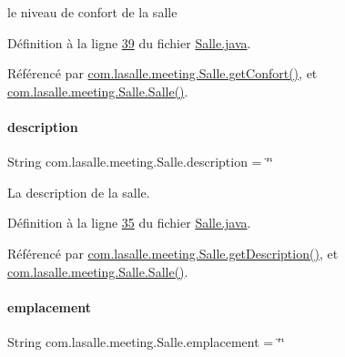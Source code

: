 le niveau de confort de la salle 



Définition à la ligne \hyperlink{_salle_8java_source_l00039}{39} du fichier \hyperlink{_salle_8java_source}{Salle.\+java}.



Référencé par \hyperlink{_salle_8java_source_l00224}{com.\+lasalle.\+meeting.\+Salle.\+get\+Confort()}, et \hyperlink{_salle_8java_source_l00054}{com.\+lasalle.\+meeting.\+Salle.\+Salle()}.

\mbox{\label{classcom_1_1lasalle_1_1meeting_1_1_salle_a79547b79b4e812619f6cc764dbe7a80b}} 
\paragraph{\texorpdfstring{description}{description}}
{\footnotesize\ttfamily String com.\+lasalle.\+meeting.\+Salle.\+description = \char`\"{}\char`\"{}\hspace{0.3cm}{\ttfamily [private]}}



La description de la salle. 



Définition à la ligne \hyperlink{_salle_8java_source_l00035}{35} du fichier \hyperlink{_salle_8java_source}{Salle.\+java}.



Référencé par \hyperlink{_salle_8java_source_l00276}{com.\+lasalle.\+meeting.\+Salle.\+get\+Description()}, et \hyperlink{_salle_8java_source_l00054}{com.\+lasalle.\+meeting.\+Salle.\+Salle()}.

\mbox{\label{classcom_1_1lasalle_1_1meeting_1_1_salle_a9e31fc4d4c9125e511db52da3254bcba}} 
\paragraph{\texorpdfstring{emplacement}{emplacement}}
{\footnotesize\ttfamily String com.\+lasalle.\+meeting.\+Salle.\+emplacement = \char`\"{}\char`\"{}\hspace{0.3cm}{\ttfamily [private]}}



